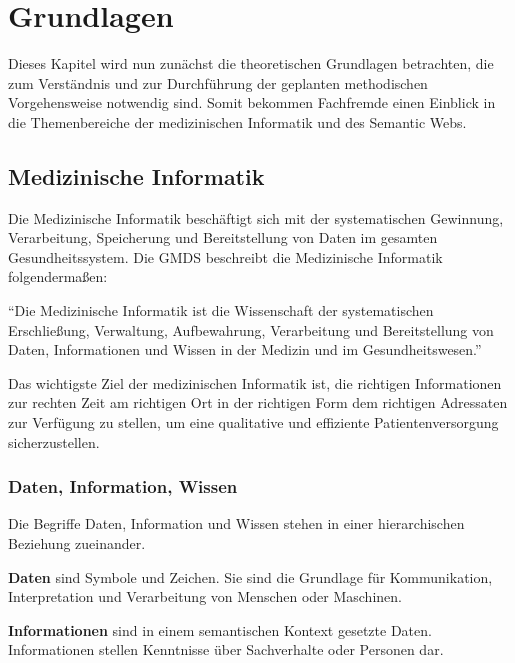 \chapter{Grundlagen}\label{ch:preliminaries}

Dieses Kapitel wird nun zunächst die theoretischen Grundlagen betrachten, die zum Verständnis und zur Durchführung der geplanten methodischen Vorgehensweise notwendig sind.
Somit bekommen Fachfremde einen Einblick in die Themenbereiche der medizinischen Informatik und des Semantic Webs.

\section{Medizinische Informatik}\label{sec:mi}

Die Medizinische Informatik beschäftigt sich mit der systematischen Gewinnung, Verarbeitung, Speicherung und Bereitstellung von Daten im gesamten Gesundheitssystem. 
Die \ac{GMDS} beschreibt die Medizinische Informatik folgendermaßen: \\

\begin{addmargin}[10pt]{10pt}
\enquote{Die Medizinische Informatik ist die Wissenschaft der systematischen Erschließung, Verwaltung, Aufbewahrung, Verarbeitung und Bereitstellung von Daten, Informationen und 	Wissen in der Medizin und im Gesundheitswesen.} \\
\end{addmargin}

Das wichtigste Ziel der medizinischen Informatik ist, die richtigen Informationen zur rechten Zeit am richtigen Ort in der richtigen Form dem richtigen Adressaten zur Verfügung zu stellen, um eine qualitative und effiziente Patientenversorgung sicherzustellen. \citep[vgl.]{winter_health_2011}

\subsection{Daten, Information, Wissen}

Die Begriffe Daten, Information und Wissen stehen in einer hierarchischen Beziehung zueinander.

\textbf{Daten} sind Symbole und Zeichen. Sie sind die Grundlage für Kommunikation, Interpretation und Verarbeitung von Menschen oder Maschinen.

\textbf{Informationen} sind in einem semantischen Kontext gesetzte Daten.
Informationen stellen Kenntnisse über Sachverhalte oder Personen dar.

